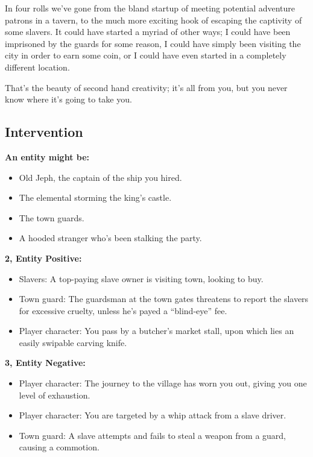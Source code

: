 \documentclass[12pt, letterpaper]{article}
\begin{document}
In four rolls we've gone from the bland startup of meeting potential adventure patrons in a tavern, to the much more exciting hook of escaping the captivity of some slavers. It could have started a myriad of other ways; I could have been imprisoned by the guards for some reason, I could have simply been visiting the city in order to earn some coin, or I could have even started in a completely different location.

That's the beauty of second hand creativity; it's all from you, but you never know where it's going to take you.

\subsection*{Intervention}

\textbf{An entity might be:}
\begin{itemize}[noitemsep, topsep=0pt]
\item Old Jeph, the captain of the ship you hired.
\item The elemental storming the king's castle.
\item The town guards.
\item A hooded stranger who's been stalking the party.
\end{itemize}

\textbf{2, Entity Positive:}
\begin{itemize}[noitemsep, topsep=0pt]
\item Slavers: A top-paying slave owner is visiting town, looking to buy.
\item Town guard: The guardsman at the town gates threatens to report the slavers for excessive cruelty, unless he's payed a ``blind-eye'' fee.
\item Player character: You pass by a butcher's market stall, upon which lies an easily swipable carving knife.
\end{itemize}

\noindent\textbf{3, Entity Negative:}
\begin{itemize}[noitemsep, topsep=0pt]
\item Player character: The journey to the village has worn you out, giving you one level of exhaustion.
\item Player character: You are targeted by a whip attack from a slave driver.
\item Town guard: A slave attempts and fails to steal a weapon from a guard, causing a commotion.
\end{itemize}
\end{document}

